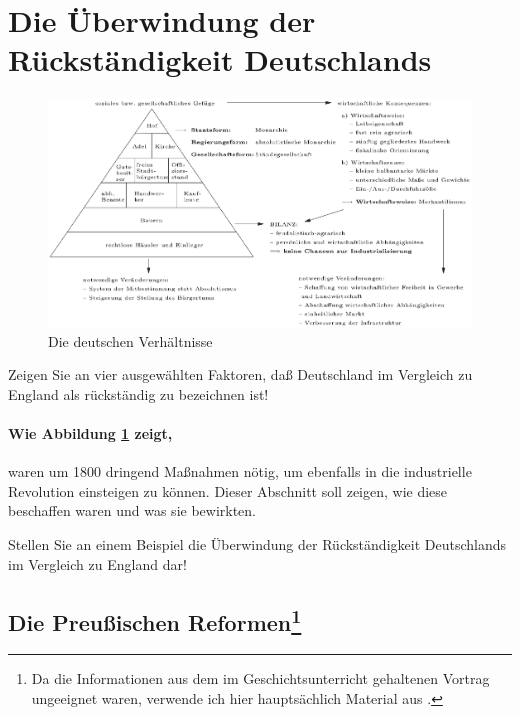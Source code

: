 \section{Die Überwindung der Rückständigkeit Deutschlands}
\label{sec:aufh-rueckst-d}

\begin{figure}
\centering
%
\includegraphics[width=\textwidth]{vergl-d-e.eps}
\caption{Die deutschen Verhältnisse}
\label{pic:dt-verh}
\end{figure}

\begin{aufgabe}
Zeigen Sie an vier ausgewählten Faktoren, daß Deutschland im
Vergleich zu England als rückständig zu bezeichnen ist!
\end{aufgabe}

\paragraph{Wie Abbildung \ref{pic:dt-verh} zeigt,} waren um 1800
dringend Maßnahmen nötig, um ebenfalls in die industrielle Revolution
einsteigen zu können. Dieser Abschnitt soll zeigen, wie diese
beschaffen waren und was sie bewirkten. \\

\begin{aufgabe}
Stellen Sie an einem Beispiel die Überwindung der Rückständigkeit
Deutschlands im Vergleich zu England dar!
\end{aufgabe}

\subsection[Die Preußischen Reformen]
{Die Preußischen Reformen\footnote{Da die Informationen aus dem im
Geschichtsunterricht gehaltenen Vortrag ungeeignet waren, verwende ich
hier hauptsächlich Material aus \cite{BaswiSchuGesch}.}}

